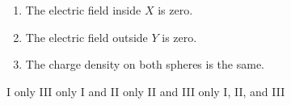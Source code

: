 \documentclass[12pt]{../../oss-apphys-exam}
\begin{document}
\begin{questions}
  \begin{enumerate}[nosep,label=\Roman*.]
  \item The electric field inside $X$ is zero.
  \item The electric field outside $Y$ is zero.
  \item The charge density on both spheres is the same.
  \end{enumerate}

  \vspace{.2in}\begin{choices}
    \choice I only
    \choice III only
    \choice I and II only
    \choice II and III only
    \choice I, II, and III
  \end{choices}
  \newpage
  
%
  

\end{questions}
\end{document}

